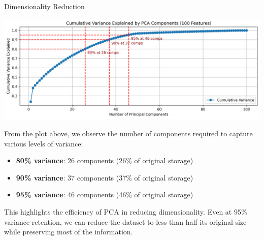 \documentclass{beamer}
\begin{document}
\begin{frame}{Dimensionality Reduction}
     \begin{center}
        \includegraphics[width=0.8\linewidth]{images/pca/cumulative_variance.png} \\
    \end{center}

    \small{
        From the plot above, we observe the number of components required to capture various levels of variance:
    
        \begin{itemize}
            \item \textbf{80\% variance}: 26 components (26\% of original storage)
            \item \textbf{90\% variance}: 37 components (37\% of original storage)
            \item \textbf{95\% variance}: 46 components (46\% of original storage)
        \end{itemize}
        
        This highlights the efficiency of PCA in reducing dimensionality. Even at 95\% variance retention, we can reduce the dataset to less than half its original size while preserving most of the information.
    }
    
\end{frame}
\end{document}
